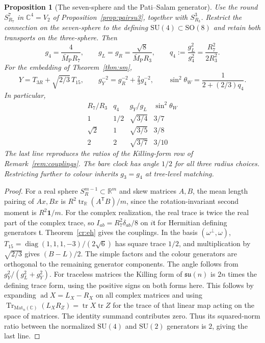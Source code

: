\documentclass[aps,pra,onecolumn,superscriptaddress,nofootinbib,10pt]{revtex4-2}
\newtheorem{proposition}[theorem]{Proposition}
\theoremstyle{definition}
\theoremstyle{remark}
\newcommand{\SU}{\mathrm{SU}}
\newcommand{\SO}{\mathrm{SO}}
\begin{document}
\begin{proposition}[The seven-sphere and the Pati--Salam generator]\label{cr:s7}
Use the round $S^7_{R_7}$ in $\mathbb C^4=V_2$ of
Proposition~\ref{prop:pairsu3}, together with $S^3_{R_3}$.
Restrict the connection on the seven-sphere to the defining
$\SU(4)\subset\SO(8)$ and retain both transports
on the three-sphere. Then
\[
 g_4=\frac{4}{\bar M_{\mathrm P} R_7},\qquad
 g_L=g_R=\frac{\sqrt8}{\bar M_{\mathrm P} R_3},\qquad
 q_4:=\frac{g_L^2}{g_4^2}=\frac{R_7^2}{2R_3^2}.
\]
For the embedding of Theorem~\ref{thm:sm},
\begin{equation}\label{cr:angle}
 Y=T_{3R}+\sqrt{2/3}\,T_{15},\qquad
 g_Y^{-2}=g_R^{-2}+\tfrac23 g_4^{-2},\qquad
 \sin^2\theta_W=\frac{1}{2+(2/3)q_4}.
\end{equation}
In particular,
\[
\begin{array}{c|c|c|c}
 R_7/R_3 & q_4 & g_Y/g_L & \sin^2\theta_W\\ \hline
 1 & 1/2 & \sqrt{3/4} & 3/7\\
 \sqrt2 & 1 & \sqrt{3/5} & 3/8\\
 2 & 2 & \sqrt{3/7} & 3/10
\end{array}
\]
The last line reproduces the ratios of the Killing-form row of
Remark~\ref{rem:couplings}. The bare clock has angle $1/2$ for all
three radius choices. Restricting further to colour inherits
$g_3=g_4$ at tree-level matching.
\end{proposition}
\begin{proof}
For a real sphere $S_R^{m-1}\subset\mathbb R^m$ and skew matrices
$A,B$, the mean length pairing of $Ax,Bx$ is
$R^2\operatorname{tr}_{\mathbb R}(A^{\mathsf T}B)/m$, since the
rotation-invariant second moment is $R^2\mathbf 1/m$.
For the complex realization, the real trace is twice the real part
of the complex trace, so $I_{ab}=R_7^2\delta_{ab}/8$ on
$i\mathfrak{t}$ for Hermitian defining generators $\mathfrak{t}$.
Theorem~\ref{cr:eh} gives the couplings. In the basis
$(\omega^\perp,\omega)$,
$T_{15}=\operatorname{diag}(1,1,1,-3)/(2\sqrt6)$ has square trace
$1/2$, and multiplication by $\sqrt{2/3}$ gives $(B-L)/2$.
The simple factors and the colour generators are orthogonal to
the remaining generator components. The angle follows from
$g_Y^2/(g_L^2+g_Y^2)$. For traceless matrices the Killing form of
$\mathfrak{su}(n)$ is $2n$ times the defining trace form, using the
positive signs on both forms here. This follows by expanding
$\operatorname{ad}X=L_X-R_X$ on all complex matrices and using
$\operatorname{Tr}_{\mathrm{Mat}_n(\mathbb C)}(L_XR_Z)
=\operatorname{tr}X\operatorname{tr}Z$ for the trace of that linear map acting on the space of matrices.
The identity summand contributes zero. Thus its squared-norm ratio
between the normalized $\SU(4)$ and $\SU(2)$
generators is $2$, giving the last line.
\end{proof}
\end{document}
